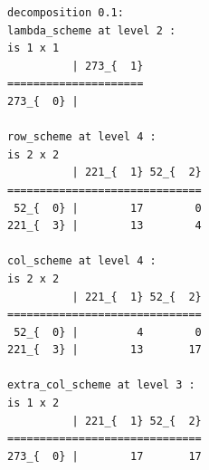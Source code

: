 \begin{verbatim}
decomposition 0.1:
lambda_scheme at level 2 : 
is 1 x 1
          | 273_{  1}
=====================
273_{  0} | 

row_scheme at level 4 : 
is 2 x 2
          | 221_{  1} 52_{  2}
==============================
 52_{  0} |        17        0
221_{  3} |        13        4

col_scheme at level 4 : 
is 2 x 2
          | 221_{  1} 52_{  2}
==============================
 52_{  0} |         4        0
221_{  3} |        13       17

extra_col_scheme at level 3 : 
is 1 x 2
          | 221_{  1} 52_{  2}
==============================
273_{  0} |        17       17
\end{verbatim}

